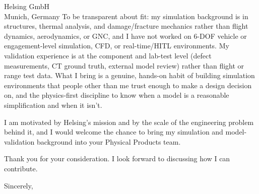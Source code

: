 \documentclass[10pt]{letter}
\begin{document}
\begin{letter}{Helsing GmbH \\ Munich, Germany}
To be transparent about fit: my simulation background is in structures, thermal analysis, and damage/fracture mechanics rather than flight dynamics, aerodynamics, or GNC, and I have not worked on 6-DOF vehicle or engagement-level simulation, CFD, or real-time/HITL environments. My validation experience is at the component and lab-test level (defect measurements, CT ground truth, external model review) rather than flight or range test data. What I bring is a genuine, hands-on habit of building simulation environments that people other than me trust enough to make a design decision on, and the physics-first discipline to know when a model is a reasonable simplification and when it isn't.

I am motivated by Helsing's mission and by the scale of the engineering problem behind it, and I would welcome the chance to bring my simulation and model-validation background into your Physical Products team.

Thank you for your consideration. I look forward to discussing how I can contribute.

\closing{Sincerely,}
\end{letter}
\end{document}
